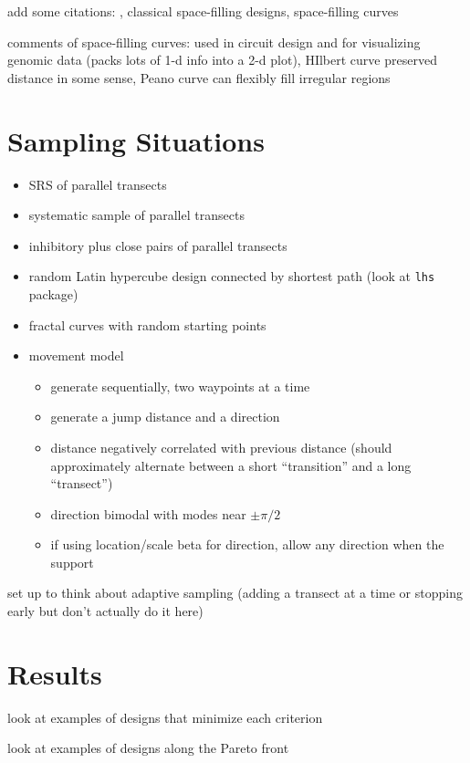 \documentclass[12pt]{article}
\begin{document}
add some citations: \citet{lark}, classical space-filling designs,
space-filling curves \cite{sagan}

comments of space-filling curves: used in circuit design and for visualizing
genomic data (packs lots of 1-d info into a 2-d plot), HIlbert curve preserved
distance in some sense, Peano curve can flexibly fill irregular regions


\section{Sampling Situations}

\begin{itemize}

\item SRS of parallel transects

\item systematic sample of parallel transects

\item inhibitory plus close pairs of parallel transects

\item random Latin hypercube design connected by shortest path (look at
\texttt{lhs} package)

\item fractal curves with random starting points

\item movement model
\begin{itemize}
\item generate sequentially, two waypoints at a time
\item generate a jump distance and a direction
\item distance negatively correlated with previous distance (should
approximately alternate between a short ``transition'' and a long ``transect'')
\item direction bimodal with modes near \(\pm \pi / 2\)
\item if using location/scale beta for direction, allow any direction when the
support 
\end{itemize}

\end{itemize}

set up to think about adaptive sampling (adding a transect at a time or
stopping early but don't actually do it here)


\section{Results}

look at examples of designs that minimize each criterion

look at examples of designs along the Pareto front




\end{document}
